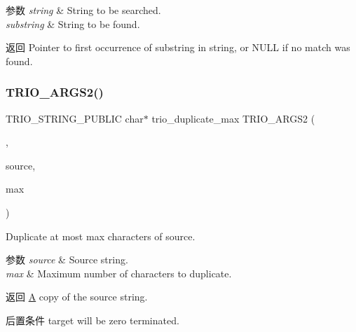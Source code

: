 \begin{DoxyParams}{参数}
{\em string} & String to be searched. \\
\hline
{\em substring} & String to be found. \\
\hline
\end{DoxyParams}
\begin{DoxyReturn}{返回}
Pointer to first occurrence of {\ttfamily substring} in {\ttfamily string}, or N\+U\+LL if no match was found. 
\end{DoxyReturn}
\mbox{\label{group___static_strings_ga74465c7cbc62a01224a71ef6a5df4c88}} 
\subsubsection{\texorpdfstring{T\+R\+I\+O\+\_\+\+A\+R\+G\+S2()}{TRIO\_ARGS2()}\hspace{0.1cm}{\footnotesize\ttfamily [3/9]}}
{\footnotesize\ttfamily T\+R\+I\+O\+\_\+\+S\+T\+R\+I\+N\+G\+\_\+\+P\+U\+B\+L\+IC char$\ast$ trio\+\_\+duplicate\+\_\+max T\+R\+I\+O\+\_\+\+A\+R\+G\+S2 (\begin{DoxyParamCaption}\item[{(\hyperlink{structsource}{source}, max)}]{,  }\item[{T\+R\+I\+O\+\_\+\+C\+O\+N\+ST char $\ast$}]{source,  }\item[{size\+\_\+t}]{max }\end{DoxyParamCaption})}

Duplicate at most {\ttfamily max} characters of {\ttfamily source}.


\begin{DoxyParams}{参数}
{\em source} & Source string. \\
\hline
{\em max} & Maximum number of characters to duplicate. \\
\hline
\end{DoxyParams}
\begin{DoxyReturn}{返回}
\hyperlink{struct_a}{A} copy of the {\ttfamily source} string.
\end{DoxyReturn}
\begin{DoxyPostcond}{后置条件}
{\ttfamily target} will be zero terminated. 
\end{DoxyPostcond}
\mbox{\label{group___static_strings_ga1d744e13e6729724acec0f8ae113402d}} 
